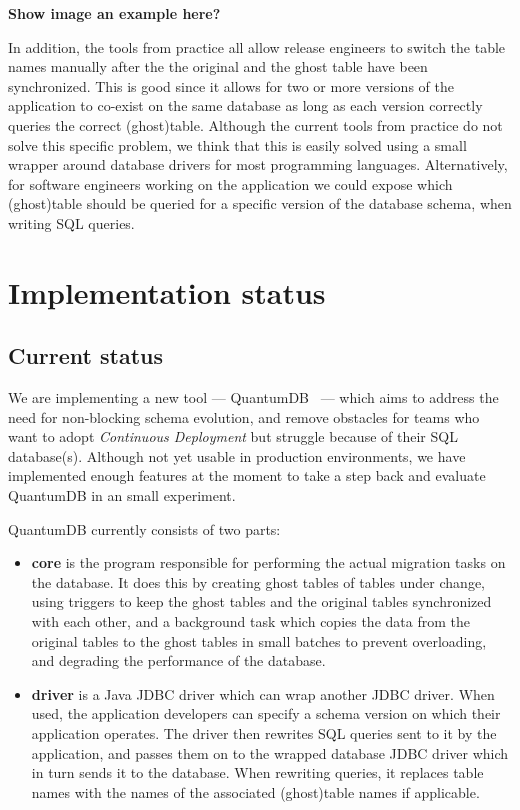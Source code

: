 \documentclass[conference]{IEEEtran}
\begin{document}
\textbf{Show image an example here?}

In addition, the tools from practice all allow release engineers to switch the table names manually after the the original and the ghost table have been synchronized. This is good since it allows for two or more versions of the application to co-exist on the same database as long as each version correctly queries the correct (ghost)table. Although the current tools from practice do not solve this specific problem, we think that this is easily solved using a small wrapper around database drivers for most programming languages. Alternatively, for software engineers working on the application we could expose which (ghost)table should be queried for a specific version of the database schema, when writing SQL queries.

\section{Implementation status} %

\subsection{Current status}

We are implementing a new tool --- QuantumDB~\cite{QuantumDB} --- which aims to address the need for non-blocking schema evolution, and remove obstacles for teams who want to adopt \textit{Continuous Deployment} but struggle because of their SQL database(s). Although not yet usable in production environments, we have implemented enough features at the moment to take a step back and evaluate QuantumDB in an small experiment. 

QuantumDB currently consists of two parts: 
\begin{itemize}
  \item{\textbf{core} is the program responsible for performing the actual migration tasks on the database. It does this by creating ghost tables of tables under change, using triggers to keep the ghost tables and the original tables synchronized with each other, and a background task which copies the data from the original tables to the ghost tables in small batches to prevent overloading, and degrading the performance of the database.}
  \item{\textbf{driver} is a Java JDBC driver which can wrap another JDBC driver. When used, the application developers can specify a schema version on which their application operates. The driver then rewrites SQL queries sent to it by the application, and passes them on to the wrapped database JDBC driver which in turn sends it to the database. When rewriting queries, it replaces table names with the names of the associated (ghost)table names if applicable.}
\end{itemize}
\end{document}
